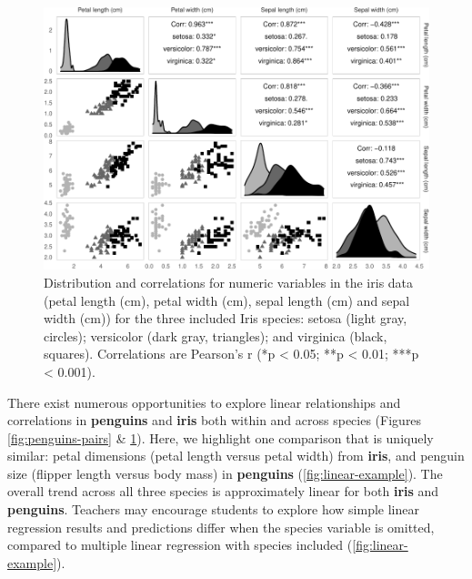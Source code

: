 \begin{Schunk}
\begin{figure}
\includegraphics{penguins_files/figure-latex/iris-pairs-1} \caption[Distribution and correlations for numeric variables in the iris data (petal length (cm), petal width (cm), sepal length (cm) and sepal width (cm)) for the three included Iris species]{Distribution and correlations for numeric variables in the iris data (petal length (cm), petal width (cm), sepal length (cm) and sepal width (cm)) for the three included Iris species: setosa (light gray, circles); versicolor (dark gray, triangles); and virginica (black, squares). Correlations are Pearson's r (*p < 0.05; **p < 0.01; ***p < 0.001).}\label{fig:iris-pairs}
\end{figure}
\end{Schunk}

There exist numerous opportunities to explore linear relationships and
correlations in \textbf{penguins} and \textbf{iris} both within and
across species (Figures \ref{fig:penguins-pairs} \&
\ref{fig:iris-pairs}). Here, we highlight one comparison that is
uniquely similar: petal dimensions (petal length versus petal width)
from \textbf{iris}, and penguin size (flipper length versus body mass)
in \textbf{penguins} (\ref{fig:linear-example}). The overall trend
across all three species is approximately linear for both \textbf{iris}
and \textbf{penguins}. Teachers may encourage students to explore how
simple linear regression results and predictions differ when the species
variable is omitted, compared to multiple linear regression with species
included (\ref{fig:linear-example}).

